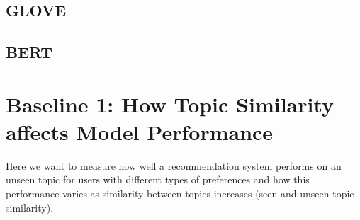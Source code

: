 \documentclass[a4paper,fontsize=8.0pt]{scrartcl}
\begin{document}
\subsection{GLOVE}
\subsection{BERT}

\newpage
\section{Baseline 1: How Topic Similarity affects Model Performance}
\begin{flushleft}
Here we want to measure how well a recommendation system performs on an unseen topic for users with different types of preferences and how this performance varies as similarity between topics increases (seen and unseen topic similarity).
\end{flushleft}
\end{document}
